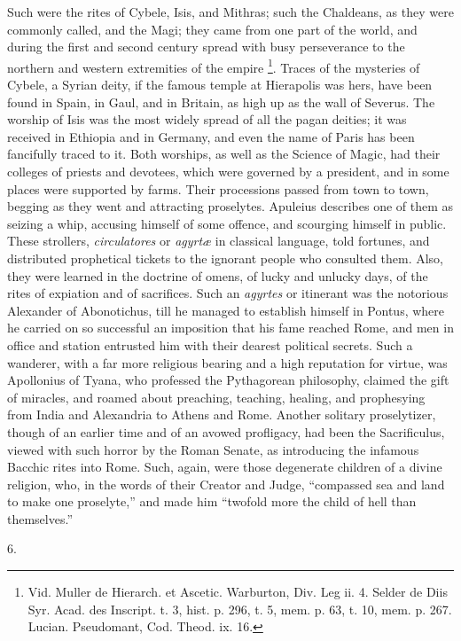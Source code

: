 Such were the rites of Cybele, Isis, and Mithras; such
the Chaldeans, as they were commonly called, and the
Magi; they came from one part of the world, and during
the first and second century spread with busy
perseverance to the northern and western extremities of
the empire \footnote{Vid. Muller de Hierarch. et
Ascetic. Warburton, Div. Leg ii. 4. Selder de Diis Syr.
Acad. des Inscript. t. 3, hist. p. 296, t. 5, mem. p. 63,
t. 10, mem. p. 267. Lucian. Pseudomant, Cod. Theod. ix.
16.}. Traces of the mysteries of Cybele, a Syrian
deity, if the famous temple at Hierapolis was hers, have
been found in Spain, in Gaul, and in Britain, as high up
as the wall of Severus. The worship of Isis was the most
widely spread of all the pagan deities; it was received
in Ethiopia and in Germany, and even the name of Paris
has been fancifully traced to it. Both worships, as well
as the Science of Magic, had their colleges of priests
and devotees, which were governed by a president, and in
some places were supported by farms. Their processions
passed from town to town, begging as they went and
attracting proselytes. Apuleius describes one of them as
seizing a whip, accusing himself of some offence, and
scourging himself in public. These strollers, \emph{circulatores}
or \emph{agyrtæ} in classical language, told fortunes,
and distributed prophetical tickets to the ignorant
people who consulted them. Also, they were learned in the
doctrine of omens, of lucky and unlucky days, of the
rites of expiation and of sacrifices. Such an \emph{agyrtes}
or itinerant was the notorious Alexander of Abonotichus,
till he managed to establish himself in Pontus, where he
carried on so successful an imposition that his fame
reached Rome, and men in office and station entrusted him
with their dearest political secrets. Such a wanderer,
with a far more religious bearing and a high reputation
for virtue, was Apollonius of Tyana, who professed the
Pythagorean philosophy, claimed the gift of miracles, and
roamed about preaching, teaching, healing, and
prophesying from India and Alexandria to Athens and Rome.
Another solitary proselytizer, though of an earlier time
and of an avowed profligacy, had been the Sacrificulus,
viewed with such horror by the Roman Senate, as
introducing the infamous Bacchic rites into Rome. Such,
again, were those degenerate children of a divine
religion, who, in the words of their Creator and Judge,
``compassed sea and land to make one proselyte,''
and made him ``twofold more the child of hell than
themselves.''

6.

